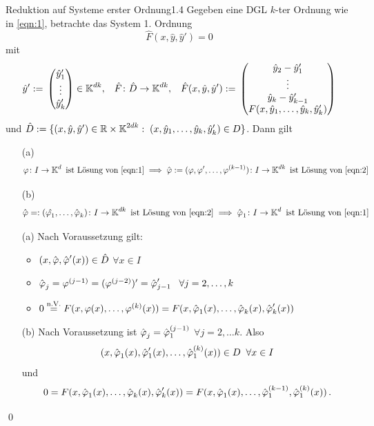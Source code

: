 \documentclass[a4paper]{article}
\begin{document}
\begin{Satz}{Reduktion auf Systeme erster Ordnung}{1.4}
Gegeben eine DGL $k$-ter Ordnung wie in \eqref{eqn:1}, betrachte das System 1. Ordnung
\begin{equation}\label{eqn:2}
\hat{F}(x,\hat{y},\hat{y}')=0
\end{equation}
mit 
\[\hat{y}':=\mathop{}\begin{pmatrix}\hat{y}_1'\\\vdots\\\hat{y}_k'\end{pmatrix}\in \operatorname{\mathbb K}^{dk},\;\;\; \hat{F}\colon \hat{D}\to \operatorname{\mathbb K}^{dk},\;\;\;\hat{F}(x,\hat{y},\hat{y}'):=\mathop{}\begin{pmatrix}\hat{y}_2-\hat{y}_1'\\\vdots\\\hat{y}_k-\hat{y}_{k-1}'\\F(x,\hat{y}_1,\ldots,\hat{y}_k,\hat{y}_k')\end{pmatrix}\]
und $\hat{D}:=\{(x,\hat{y},\hat{y}')\in \mathbb R\times \operatorname{\mathbb K}^{2dk}:\; (x,\hat{y}_1,\ldots,\hat{y}_k,\hat{y}_k')\in D\}$.
Dann gilt
\begin{itemize}
    \item[(a)] 
    \[\operatorname{\varphi}\colon I\to\operatorname{\mathbb K}^d\text{ ist Lösung von \eqref{eqn:1}}\implies \hat{\operatorname{\varphi}}:=(\operatorname{\varphi},\operatorname{\varphi}',\ldots,\operatorname{\varphi}^{(k-1)})\colon I\to\operatorname{\mathbb K}^{dk}\text{ ist Lösung von \eqref{eqn:2}}\]
    \item[(b)]
    \[\hat{\operatorname{\varphi}}=:(\hat{\operatorname{\varphi}_1},\ldots,\hat{\operatorname{\varphi}}_k)\colon I\to \operatorname{\mathbb K}^{dk}\text{ ist Lösung von \eqref{eqn:2}}\implies \hat{\operatorname{\varphi}}_1\colon I\to \operatorname{\mathbb K}^d\text{ ist Lösung von \eqref{eqn:1}}\]
\end{itemize}
\end{Satz}

\begin{Beweis}
\begin{itemize}
\item[(a)] Nach Voraussetzung gilt:
\begin{itemize}
\item $(x,\hat{\operatorname{\varphi}},\hat{\operatorname{\varphi}}'(x))\in\hat D$ $\forall x\in I$
\item $\hat{\operatorname{\varphi}}_j=\operatorname{\varphi}^{(j-1)}=(\operatorname{\varphi}^{(j-2)})'=\hat{\operatorname{\varphi}}_{j-1}'\;\;\;\forall j=2,\ldots,k$
\item $0\overset{\text{n.V.}}{=} F(x,\operatorname{\varphi}(x),\ldots, \operatorname{\varphi}^{(k)}(x))=F(x,\hat{\operatorname{\varphi}}_1(x),\ldots,\hat{\operatorname{\varphi}}_k(x),\hat{\operatorname{\varphi}}_k'(x))$
\end{itemize}
\item[(b)] Nach Voraussetzung ist $\hat{\operatorname{\varphi}}_j=\hat{\operatorname{\varphi}}_1^{(j-1)}$ $\forall j=2,\ldots k$. Also
\[(x,\hat{\operatorname{\varphi}}_1(x),\hat{\operatorname{\varphi}}_1'(x),\ldots, \hat{\operatorname{\varphi}}_1^{(k)}(x))\in D\;\;\forall x\in I\]
und
\[0=F(x,\hat{\operatorname{\varphi}}_1(x),\ldots,\hat{\operatorname{\varphi}}_k(x),\hat{\operatorname{\varphi}}_k'(x))=F(x,\hat{\operatorname{\varphi}}_1(x),\ldots,\hat{\operatorname{\varphi}}_1^{(k-1)},\hat{\operatorname{\varphi}}_1^{(k)}(x))\,.\]
\end{itemize}
\qed
\end{Beweis}
\end{document}
